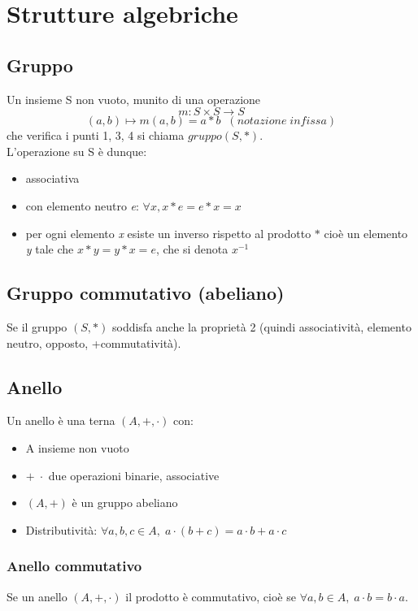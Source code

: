 \section{Strutture algebriche}

\subsection{Gruppo} 
Un insieme S non vuoto, munito di una operazione \[m:S\times S\rightarrow S\]
\[(a,b)\mapsto m(a,b)=a\ast b\;\; (notazione\; infissa)\]
che verifica i punti 1, 3, 4 si chiama \(gruppo(S,\ast)\).
\\L'operazione su S è dunque:
\begin{itemize}
    \item associativa
    \item con elemento neutro \textit{e}: \(\forall x, x\ast e=e\ast x=x\)
    \item per ogni elemento \textit{x} esiste un inverso rispetto al prodotto \(\ast\) cioè un elemento \textit{y} tale che \(x\ast y=y\ast x=e\), che si denota \(x^{-1}\)
\end{itemize}

\subsection{Gruppo commutativo (abeliano)} 
Se il gruppo \((S, \ast)\) soddisfa anche la proprietà 2 (quindi associatività,  elemento neutro, opposto, +commutatività).

\subsection{Anello} 
Un anello è una terna \((A,+,\cdot)\) con:
\begin{itemize}
    \item A insieme non vuoto
    \item \(+ \; \cdot\) due operazioni binarie, associative
    \item \((A,+)\) è un gruppo abeliano
    \item Distributività: \(\forall a, b, c \in A, \; a\cdot (b+c)=a\cdot b+a\cdot c\)
\end{itemize}

\subsubsection{Anello commutativo} 
Se un anello \((A,+,\cdot)\) il prodotto è commutativo, cioè se \(\forall a,b\in A,\;a\cdot b=b\cdot a\).

